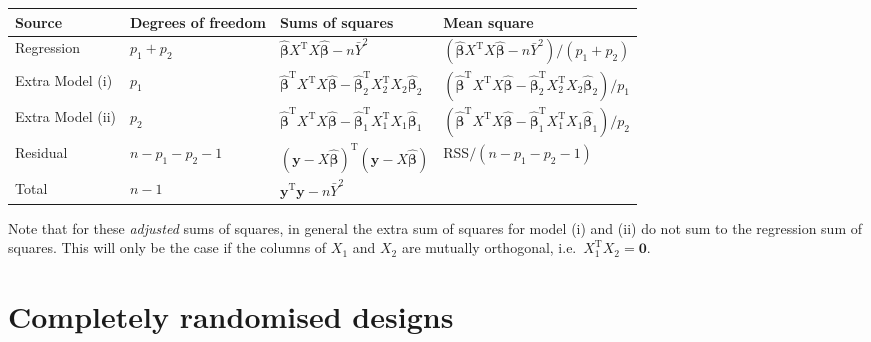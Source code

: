 \documentclass[
]{book}
\theoremstyle{definition}
\theoremstyle{definition}
\theoremstyle{definition}
\theoremstyle{definition}
\theoremstyle{remark}
\begin{document}
\begin{enumerate}
  \begin{longtable}[]{@{}
    >{\centering\arraybackslash}p{}
    >{\centering\arraybackslash}p{}
    >{\centering\arraybackslash}p{}
    >{\centering\arraybackslash}p{}@{}}
  \toprule
  Source & Degrees of freedom & Sums of squares & Mean square \\
  \midrule
  \endhead
  Regression & \(p_1+p_2\) & \(\hat{\boldsymbol{\beta}}X^{\mathrm{T}}X\hat{\boldsymbol{\beta}} - n\bar{Y}^2\) & \(\left(\hat{\boldsymbol{\beta}}X^{\mathrm{T}}X\hat{\boldsymbol{\beta}} - n\bar{Y}^2\right)/(p_1+p_2)\) \\
  Extra Model (i) & \(p_1\) & \(\hat{\boldsymbol{\beta}}^{\mathrm{T}}X^{\mathrm{T}}X\hat{\boldsymbol{\beta}} - \hat{\boldsymbol{\beta}}_2^{\mathrm{T}}X_2^{\mathrm{T}}X_2\hat{\boldsymbol{\beta}}_2\) & \(\left(\hat{\boldsymbol{\beta}}^{\mathrm{T}}X^{\mathrm{T}}X\hat{\boldsymbol{\beta}} - \hat{\boldsymbol{\beta}}_2^{\mathrm{T}}X_2^{\mathrm{T}}X_2\hat{\boldsymbol{\beta}}_2\right)/p_1\) \\
  Extra Model (ii) & \(p_2\) & \(\hat{\boldsymbol{\beta}}^{\mathrm{T}}X^{\mathrm{T}}X\hat{\boldsymbol{\beta}} - \hat{\boldsymbol{\beta}}_1^{\mathrm{T}}X_1^{\mathrm{T}}X_1\hat{\boldsymbol{\beta}}_1\) & \(\left(\hat{\boldsymbol{\beta}}^{\mathrm{T}}X^{\mathrm{T}}X\hat{\boldsymbol{\beta}} - \hat{\boldsymbol{\beta}}_1^{\mathrm{T}}X_1^{\mathrm{T}}X_1\hat{\boldsymbol{\beta}}_1\right)/p_2\) \\
  Residual & \(n-p_1-p_2-1\) & \((\boldsymbol{y}- X\hat{\boldsymbol{\beta}})^{\mathrm{T}}(\boldsymbol{y}- X\hat{\boldsymbol{\beta}})\) & RSS\(/(n-p_1-p_2-1)\) \\
  Total & \(n-1\) & \(\boldsymbol{y}^{\mathrm{T}}\boldsymbol{y}- n\bar{Y}^2\) & \\
  \bottomrule
  \end{longtable}
\end{enumerate}

Note that for these \emph{adjusted} sums of squares, in general the extra sum of squares for model (i) and (ii) do not sum to the regression sum of squares. This will only be the case if the columns of \(X_1\) and \(X_2\) are mutually orthogonal, i.e.~\(X_1^{\mathrm{T}}X_2 = \boldsymbol{0}\).

\hypertarget{crd}{%
\chapter{Completely randomised designs}\label{crd}}
\end{document}
